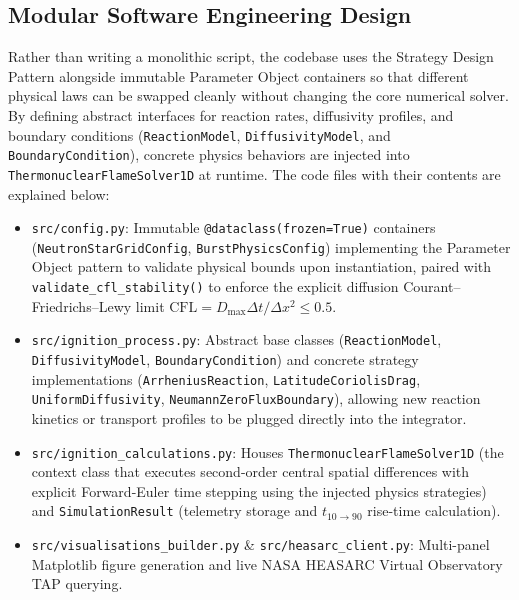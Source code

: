 \documentclass[11pt,a4paper]{article}
\begin{document}
\subsection{Modular Software Engineering Design}
Rather than writing a monolithic script, the codebase uses the Strategy Design Pattern alongside immutable Parameter Object containers so that different physical laws can be swapped cleanly without changing the core numerical solver. By defining abstract interfaces for reaction rates, diffusivity profiles, and boundary conditions (\texttt{ReactionModel}, \texttt{DiffusivityModel}, and \texttt{BoundaryCondition}), concrete physics behaviors are injected into \texttt{ThermonuclearFlameSolver1D} at runtime. The code files with their contents are explained below:
\begin{itemize}
    \item \texttt{src/config.py}: Immutable \texttt{@dataclass(frozen=True)} containers (\texttt{NeutronStarGridConfig}, \texttt{BurstPhysicsConfig}) implementing the Parameter Object pattern to validate physical bounds upon instantiation, paired with \texttt{validate\_cfl\_stability()} to enforce the explicit diffusion Courant--Friedrichs--Lewy limit $\mathrm{CFL} = D_{\max}\Delta t / \Delta x^2 \le 0.5$.
    \item \texttt{src/ignition\_process.py}: Abstract base classes (\texttt{ReactionModel}, \texttt{DiffusivityModel}, \texttt{BoundaryCondition}) and concrete strategy implementations (\texttt{ArrheniusReaction}, \texttt{LatitudeCoriolisDrag}, \texttt{UniformDiffusivity}, \texttt{NeumannZeroFluxBoundary}), allowing new reaction kinetics or transport profiles to be plugged directly into the integrator.
    \item \texttt{src/ignition\_calculations.py}: Houses \texttt{ThermonuclearFlameSolver1D} (the context class that executes second-order central spatial differences with explicit Forward-Euler time stepping using the injected physics strategies) and \texttt{SimulationResult} (telemetry storage and $t_{10 \to 90}$ rise-time calculation).
    \item \texttt{src/visualisations\_builder.py} \& \texttt{src/heasarc\_client.py}: Multi-panel Matplotlib figure generation and live NASA HEASARC Virtual Observatory TAP querying.
\end{itemize}
\end{document}
